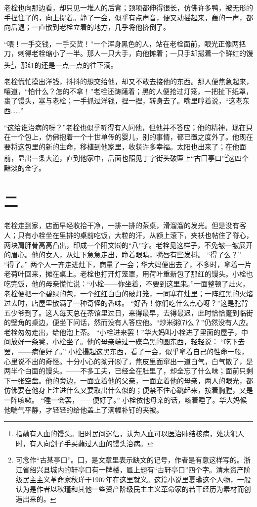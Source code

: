 \documentclass[12pt,UTF8]{ctexbook}
\begin{document}
老栓也向那边看，却只见一堆人的后背；颈项都伸得很长，仿佛许多鸭，被无形的手捏住了的，向上提着。静了一会，似乎有点声音，便又动摇起来，轰的一声，都向后退；一直散到老栓立着的地方，几乎将他挤倒了。

“喂！一手交钱，一手交货！”一个浑身黑色的人，站在老栓面前，眼光正像两把刀，刺得老栓缩小了一半。那人一只大手，向他摊着；一只手却撮着一个鲜红的馒头\footnote{指蘸有人血的馒头。旧时民间迷信，认为人血可以医治肺结核病，处决犯人时，有人向刽子手买蘸过人血的馒头治病。}，那红的还是一点一点的往下滴。

老栓慌忙摸出洋钱，抖抖的想交给他，却又不敢去接他的东西。那人便焦急起来，嚷道，“怕什么？怎的不拿！”老栓还踌躇着；黑的人便抢过灯笼，一把扯下纸罩，裹了馒头，塞与老栓；一手抓过洋钱，捏一捏，转身去了。嘴里哼着说，“这老东西……”

“这给谁治病的呀？”老栓也似乎听得有人问他，但他并不答应；他的精神，现在只在一个包上，仿佛抱着一个十世单传的婴儿，别的事情，都已置之度外了。他现在要将这包里的新的生命，移植到他家里，收获许多幸福。太阳也出来了；在他面前，显出一条大道，直到他家中，后面也照见丁字街头破匾上“古囗亭口”\footnote{可念作“古某亭口”。囗，是文章里表示缺文的记号，作者是有意这样写的。浙江省绍兴县城内的轩亭口有一牌楼，匾上题有“古轩亭口”四个字。清末资产阶级民主主义革命家秋瑾于1907年在这里就义。这篇小说里夏瑜这个人物，一般认为是作者以秋瑾和其他一些资产阶级民主主义革命家的若干经历为素材而创造出来的。}这四个黯淡的金字。

\chapter{二}

老栓走到家，店面早经收拾干净，一排一排的茶桌，滑溜溜的发光。但是没有客人；只有小栓坐在里排的桌前吃饭，大粒的汗，从额上滚下，夹袄也帖住了脊心，两块肩胛骨高高凸出，印成一个阳文⑹的“八”字。老栓见这样子，不免皱一皱展开的眉心。他的女人，从灶下急急走出，睁着眼睛，嘴唇有些发抖。
“得了么？”
“得了。”
两个人一齐走进灶下，商量了一会；华大妈便出去了，不多时，拿着一片老荷叶回来，摊在桌上。老栓也打开灯笼罩，用荷叶重新包了那红的馒头。小栓也吃完饭，他的母亲慌忙说：“小栓——你坐着，不要到这里来。”一面整顿了灶火，老栓便把一个碧绿的包，一个红红白白的破灯笼，一同塞在灶里；一阵红黑的火焰过去时，店屋里散满了一种奇怪的香味。
“好香！你们吃什么点心呀？”这是驼背五少爷到了。这人每天总在茶馆里过日，来得最早，去得最迟，此时恰恰蹩到临街的壁角的桌边，便坐下问话，然而没有人答应他。“炒米粥⑺么？”仍然没有人应。老栓匆匆走出，给他泡上茶。
“小栓进来罢！”华大妈叫小栓进了里面的屋子，中间放好一条凳，小栓坐了。他的母亲端过一碟乌黑的圆东西，轻轻说：
“吃下去罢，——病便好了。”
小栓撮起这黑东西，看了一会，似乎拿着自己的性命一般，心里说不出的奇怪。十分小心的拗开⑻了，焦皮里面窜出一道白气，白气散了，是两半个白面的馒头。——不多工夫，已经全在肚里了，却全忘了什么味；面前只剩下一张空盘。他的旁边，一面立着他的父亲，一面立着他的母亲，两人的眼光，都仿佛要在他身上注进什么又要取出什么似的；便禁不住心跳起来，按着胸膛，又是一阵咳嗽。
“睡一会罢，——便好了。”
小栓依他母亲的话，咳着睡了。华大妈候他喘气平静，才轻轻的给他盖上了满幅补钉的夹被。
\end{document}
